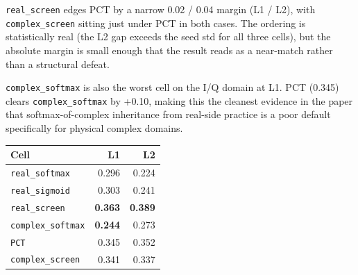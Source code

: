 \documentclass[11pt,a4paper]{article}
\theoremstyle{plain}
\theoremstyle{definition}
\begin{document}
\noindent
\begin{minipage}[t]{0.60\textwidth}
\vspace{0pt}
\texttt{real\_screen} edges PCT by a narrow 0.02 / 0.04 margin (L1 / L2), with \texttt{complex\_screen} sitting just under PCT in both cases. The ordering is statistically real (the L2 gap exceeds the seed std for all three cells), but the absolute margin is small enough that the result reads as a near-match rather than a structural defeat.

\texttt{complex\_softmax} is also the worst cell on the I/Q domain at L1. PCT (0.345) clears \texttt{complex\_softmax} by +0.10, making this the cleanest evidence in the paper that softmax-of-complex inheritance from real-side practice is a poor default specifically for physical complex domains.
\end{minipage}\hfill
\begin{minipage}[t]{0.31\textwidth}
\vspace{0pt}
\centering
{\footnotesize
\setlength{\tabcolsep}{4pt}
\renewcommand{\arraystretch}{1.08}
\begin{tabular}{|l|r|r|}
\hline
Cell & L1 & L2 \\
\hline
\texttt{real\_softmax} & 0.296 & 0.224 \\
\hline
\texttt{real\_sigmoid} & 0.303 & 0.241 \\
\hline
\texttt{real\_screen} & \textbf{0.363} & \textbf{0.389} \\
\hline
\texttt{complex\_softmax} & \textbf{0.244} & 0.273 \\
\hline
\texttt{PCT} & 0.345 & 0.352 \\
\hline
\texttt{complex\_screen} & 0.341 & 0.337 \\
\hline
\end{tabular}}
\captionsetup{skip=2pt}
\end{minipage}
\par\medskip
\end{document}
